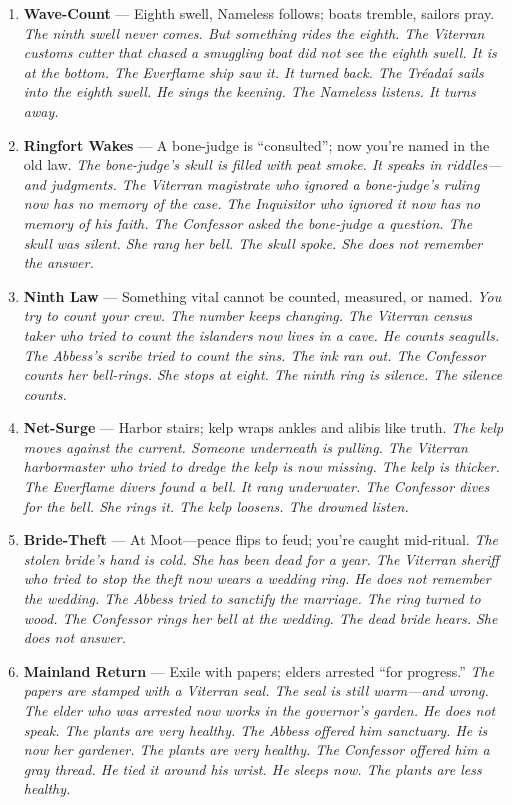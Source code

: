 \begin{enumerate}
\item \textbf{Wave-Count} --- Eighth swell, Nameless follows; boats tremble, sailors pray.
  \hfill \textit{The ninth swell never comes. But something rides the eighth. The Viterran customs cutter that chased a smuggling boat did not see the eighth swell. It is at the bottom. The Everflame ship saw it. It turned back. The Tr\'eada\'{\i} sails into the eighth swell. He sings the keening. The Nameless listens. It turns away.}
\item \textbf{Ringfort Wakes} --- A bone-judge is ``consulted''; now you're named in the old law.
  \hfill \textit{The bone-judge's skull is filled with peat smoke. It speaks in riddles---and judgments. The Viterran magistrate who ignored a bone-judge's ruling now has no memory of the case. The Inquisitor who ignored it now has no memory of his faith. The Confessor asked the bone-judge a question. The skull was silent. She rang her bell. The skull spoke. She does not remember the answer.}
\item \textbf{Ninth Law} --- Something vital cannot be counted, measured, or named.
  \hfill \textit{You try to count your crew. The number keeps changing. The Viterran census taker who tried to count the islanders now lives in a cave. He counts seagulls. The Abbess's scribe tried to count the sins. The ink ran out. The Confessor counts her bell-rings. She stops at eight. The ninth ring is silence. The silence counts.}
\item \textbf{Net-Surge} --- Harbor stairs; kelp wraps ankles and alibis like truth.
  \hfill \textit{The kelp moves against the current. Someone underneath is pulling. The Viterran harbormaster who tried to dredge the kelp is now missing. The kelp is thicker. The Everflame divers found a bell. It rang underwater. The Confessor dives for the bell. She rings it. The kelp loosens. The drowned listen.}
\item[J] \textbf{Bride-Theft} --- At Moot---peace flips to feud; you're caught mid-ritual.
  \hfill \textit{The stolen bride's hand is cold. She has been dead for a year. The Viterran sheriff who tried to stop the theft now wears a wedding ring. He does not remember the wedding. The Abbess tried to sanctify the marriage. The ring turned to wood. The Confessor rings her bell at the wedding. The dead bride hears. She does not answer.}
\item[Q] \textbf{Mainland Return} --- Exile with papers; elders arrested ``for progress.''
  \hfill \textit{The papers are stamped with a Viterran seal. The seal is still warm---and wrong. The elder who was arrested now works in the governor's garden. He does not speak. The plants are very healthy. The Abbess offered him sanctuary. He is now her gardener. The plants are very healthy. The Confessor offered him a gray thread. He tied it around his wrist. He sleeps now. The plants are less healthy.}

\end{enumerate}
